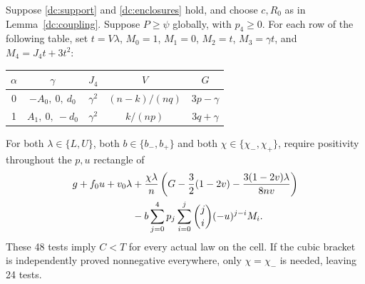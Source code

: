 \begin{theorem}\label{dc:finite-test}
\label{j:local:direct-finite}
Suppose \eqref{dc:support} and \eqref{dc:enclosures} hold, and choose
$c,R_0$ as in Lemma~\ref{dc:coupling}. Suppose $P\ge\psi$ globally,
with $p_4\ge0$. For each row of the following table,
set $t=V\lambda$, $M_0=1$, $M_1=0$, $M_2=t$, $M_3=\gamma t$,
and $M_4=J_4t+3t^2$:
\begin{center}
\begin{tabular}{ccccc}\toprule
$\alpha$&$\gamma$&$J_4$&$V$&$G$\\\midrule
0&$-A_0,\ 0,\ d_0$&$\gamma^2$&$(n-k)/(nq)$&$3p-\gamma$\\
1&$A_1,\ 0,\ -d_0$&$\gamma^2$&$k/(np)$&$3q+\gamma$\\\bottomrule
\end{tabular}
\end{center}
For both $\lambda\in\{L,U\}$, both $b\in\{b_-,b_+\}$ and both
$\chi\in\{\chi_-,\chi_+\}$, require positivity throughout the $p,u$ rectangle of
\begin{align}\label{dc:gate}
 g+f_0u+v_0\lambda
 &+\frac{\chi\lambda}{n}
 \left(G-\frac32(1-2v)-\frac{3(1-2v)\lambda}{8nv}\right)\\
 &-b\sum_{j=0}^4p_j\sum_{i=0}^j\binom ji(-u)^{j-i}M_i.\notag
\end{align}
These 48 tests imply $C<T$ for every actual law on the cell. If the cubic
bracket is independently proved nonnegative everywhere, only $\chi=\chi_-$ is
needed, leaving 24 tests.
\end{theorem}
